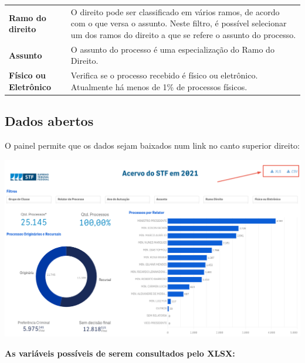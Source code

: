 \documentclass[
]{book}
\begin{document}
\begin{longtable}[]{@{}
  >{\raggedright\arraybackslash}p{}
  >{\raggedright\arraybackslash}p{}@{}}
\textbf{Ramo do direito} & O direito pode ser classificado em vários ramos, de acordo com o que versa o assunto. Neste filtro, é possível selecionar um dos ramos do direito a que se refere o assunto do processo. \\
\textbf{Assunto} & O assunto do processo é uma especialização do Ramo do Direito. \\
\textbf{Físico ou Eletrônico} & Verifica se o processo recebido é físico ou eletrônico. Atualmente há menos de 1\% de processos físicos. \\
\bottomrule
\end{longtable}

\hypertarget{dados-abertos}{%
\subsection{Dados abertos}\label{dados-abertos}}

O painel permite que os dados sejam baixados num link no canto superior direito:

\includegraphics[width=1\linewidth]{imagens/fig-cap4-4}

\textbf{As variáveis possíveis de serem consultados pelo XLSX:}
\end{document}
